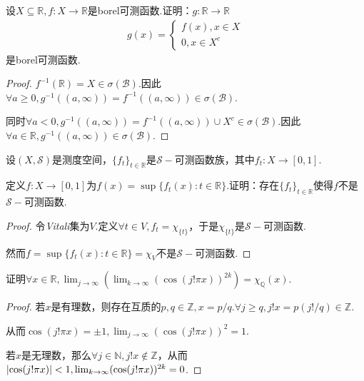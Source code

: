 \newpage

\begin{problem}[28]\label{2.B.28}
    设\(X \subseteq \mathbb{R}, f: X \to \mathbb{R}\)是borel可测函数.证明：\(g: \mathbb{R} \to \mathbb{R}\)
    \begin{align*}
        g(x)=
        \begin{cases}
            f(x), x \in X \\
            0, x \in X^c
        \end{cases}
    \end{align*}
    是borel可测函数.
\end{problem}

\begin{proof}
    \(f^{-1}(\mathbb{R})=X \in \sigma(\mathcal{B})\).因此\(\forall a \geq 0, g^{-1}((a,\infty))=f^{-1}((a,\infty)) \in \sigma(\mathcal{B})\).

    同时\(\forall a<0, g^{-1}((a,\infty))=f^{-1}((a,\infty)) \cup X^c \in \sigma(\mathcal{B})\).因此\(\forall a \in \mathbb{R}, g^{-1}((a,\infty)) \in \sigma(\mathcal{B})\).
\end{proof}

\begin{problem}[29]\label{2.B.29}
    设\((X, \mathcal{S})\)是测度空间，\(\{f_t\}_{t \in \mathbb{R}}\)是\(\mathcal{S}-\)可测函数族，其中\(f_t: X \to [0,1]\).

    定义\(f: X \to [0,1]\)为\(f(x)=\sup \{f_t(x): t \in \mathbb{R}\}\).证明：存在\(\{f_t\}_{t \in \mathbb{R}}\)使得\(f\)不是\(\mathcal{S}-\)可测函数.
\end{problem}

\begin{proof}
    令\textit{Vitali}集为\(V\).定义\(\forall t \in V, f_t=\chi_{\{t\}}\)，于是\(\chi_{\{t\}}\)是\(\mathcal{S}-\)可测函数.

    然而\(f=\sup \{f_t(x): t \in \mathbb{R}\}=\chi_V\)不是\(\mathcal{S}-\)可测函数.
\end{proof}

\begin{problem}[30]\label{2.B.30}
    证明\(\forall x \in \mathbb{R}, \lim_{j \to \infty}(\lim_{k \to \infty} (\cos(j! \pi x))^{2k})=\chi_{\mathbb{Q}}(x)\).
\end{problem}

\begin{proof}
    若\(x\)是有理数，则存在互质的\(p,q \in \mathbb{Z}, x=p/q\).\(\forall j \geq q, j! x=p(j!/q) \in \mathbb{Z}\).

    从而\(\cos(j! \pi x)=\pm 1, \lim_{j \to \infty}(\cos(j! \pi x))^2=1\).

    若\(x\)是无理数，那么\(\forall j \in \mathbb{N}, j! x \notin \mathbb{Z}\)，从而\(\abs*{\cos(j! \pi x)}<1, \lim_{k \to \infty}(\cos(j! \pi x))^{2k}=0\).
\end{proof}

